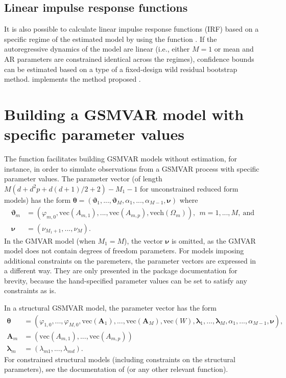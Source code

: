 \documentclass[nojss]{jss}
\begin{document}
\subsection{Linear impulse response functions}

It is also possible to calculate linear impulse response functions (IRF) based on a specific regime of the estimated model by using the function . If the autoregressive dynamics of the model are linear (i.e., either $M=1$ or mean and AR parameters are constrained identical across the regimes), confidence bounds can be estimated based on a type of a fixed-design wild residual bootstrap method.  implements the method proposed \cite{Herwartz+Lutkepohl:2014}.

\section{Building a GSMVAR model with specific parameter values}\label{sec:GSMVAR}
The function  facilitates building GSMVAR models without estimation, for instance, in order to simulate observations from a GSMVAR process with specific parameter values. The parameter vector (of length $M(d + d^2p + d(d+1)/2 + 2) - M_1 - 1$ for unconstrained reduced form models) has the form $\boldsymbol{\theta} = (\boldsymbol{\vartheta}_1,...,\boldsymbol{\vartheta}_M,\alpha_1,...,\alpha_{M-1},\boldsymbol{\nu})$ where
\begin{align}
\boldsymbol{\vartheta}_m &= (\varphi_{m,0},\text{vec}({A_{m,1}}),...,\text{vec}(A_{m,p}),\text{vech}(\Omega_m)),\ \ m=1,...,M, \ \text{and}  \\
\boldsymbol{\nu} &= (\nu_{M_1+1},...,\nu_M).
\end{align}
%
In the GMVAR model (when $M_1=M$), the vector $\boldsymbol{\nu}$ is omitted, as the GMVAR model does not contain degrees of freedom parameters. For models imposing additional constraints on the paremeters, the parameter vectors are expressed in a different way. They are only presented in the package documentation for brevity, because the hand-specified parameter values can be set to satisfy any constraints as is.

In a structural GSMVAR model, the parameter vector has the form
\begin{align}
\boldsymbol{\theta} &= (\varphi_{1,0},...,\varphi_{M,0},\text{vec}(\boldsymbol{A}_1),...,\text{vec}(\boldsymbol{A}_M),\text{vec}(W),\boldsymbol{\lambda}_1,...,\boldsymbol{\lambda}_M, \alpha_1,...,\alpha_{M-1},\boldsymbol{\nu}), \\
\boldsymbol{A}_m & = (\text{vec}({A_{m,1}}),...,\text{vec}(A_{m,p})) \\
\boldsymbol{\lambda}_m &= (\lambda_{m1},...,\lambda_{md}).
\end{align}
For constrained structural models (including constraints on the structural parameters), see the documentation of  (or any other relevant function).
\end{document}
